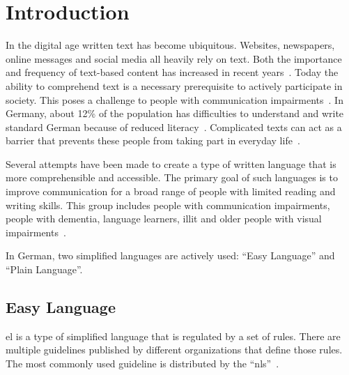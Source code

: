 \chapter{Introduction}\label{ch:introduction}

In the digital age written text has become ubiquitous.
Websites, newspapers, online messages and social media all heavily rely on text.
Both the importance and frequency of text-based content has increased in recent years~\autocite{salar-mohtaj-babak-naderi-2022-overview}.
Today the ability to comprehend text is a necessary prerequisite to actively participate in society. %
This poses a challenge to people with communication impairments~\autocite{easyLanguageBook}.
In Germany, about 12\% of the population has difficulties to understand and write standard German because of reduced literacy~\autocite{schomacker2023data}.
Complicated texts can act as a barrier that prevents these people from taking part in everyday life~\autocite{easyLanguageBook}.

Several attempts have been made to create a type of written language that is more comprehensible and accessible.
The primary goal of such languages is to improve communication for a broad range of people with limited reading and writing skills.
This group includes people with communication impairments, people with dementia, language learners, \gls{illit} and older people with visual impairments~\autocite{easyLanguageBook}.

In German, two simplified languages are actively used: \enquote{Easy Language} and \enquote{Plain Language}.


\section{Easy Language}\label{sec:el}

\gls{el} is a type of simplified language that is regulated by a set of rules.
There are multiple guidelines published by different organizations that define those rules.
The most commonly used guideline is distributed by the \enquote{\gls{nls}}~\autocite{netzwerkLS, easyLanguageBook}.

